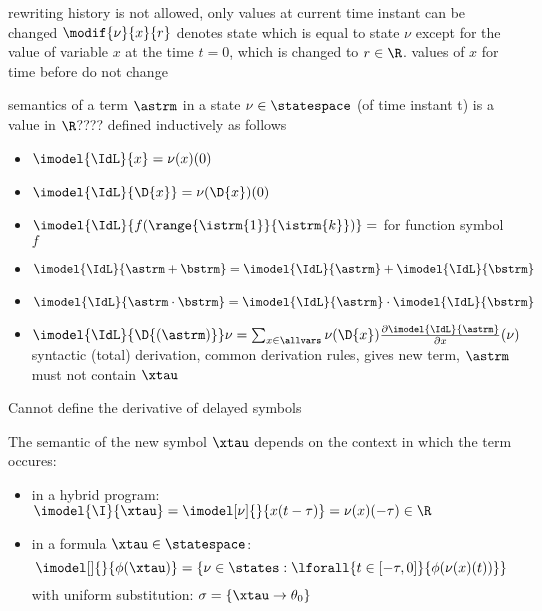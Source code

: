 
    rewriting history is not allowed, only values at current time instant can be changed $\modif{\nu}{x}{r}$ denotes state which is equal to state $\nu$ except for the value of variable $x$ at the time $t=0$, which is changed to $r\in\R$. values of $x$ for time before do not change


    \begin{definition}
        \label{def:sematic-terms}
        semantics of a term $\astrm$ in a state $\nu\in\statespace$ (of time instant t) is a value in $\R$????
        defined inductively as follows

        \begin{itemize}
            \item $\imodel{\IdL}{x} = \nu(x)(0)$
            \item $\imodel{\IdL}{\D{x}}=\nu(\D{x})(0)$
            \item $\imodel{\IdL}{f(\range{\istrm{1}}{\istrm{k}})} = $ for function symbol $f$
            \item $\imodel{\IdL}{\astrm+\bstrm} = \imodel{\IdL}{\astrm} + \imodel{\IdL}{\bstrm}$
            \item $\imodel{\IdL}{\astrm\cdot\bstrm} = \imodel{\IdL}{\astrm} \cdot \imodel{\IdL}{\bstrm}$
            \item $\imodel{\IdL}{\D{(\astrm)}}\nu = \sum_{x\in\allvars} \nu(\D{x})\frac{\partial\imodel{\IdL}{\astrm}}{\partial x}(\nu)$ syntactic (total) derivation, common derivation rules, gives new term, $\astrm$ must not contain $\xtau$
        \end{itemize}
        Cannot define the derivative of delayed symbols

        The semantic of the new symbol $\xtau$ depends on the context in which the term occures:
        \begin{itemize}
            \item in a hybrid program: $\imodel{\I}{\xtau} = \imodel[\nu]{}{x(t-\tau)} = \nu(x)(-\tau)\in\R$
            \item in a formula $\xtau\in\statespace$: \begin{equation}
                \imodel[]{}{\phi(\xtau)} =
                \{\nu\in\states : \lforall{t\in[-\tau,0]}{\phi(\nu(x)(t))} \}
            \end{equation}
            with uniform substitution: $\sigma=\{\xtau\rightarrow\theta_0\}$
        \end{itemize}


\end{definition}

